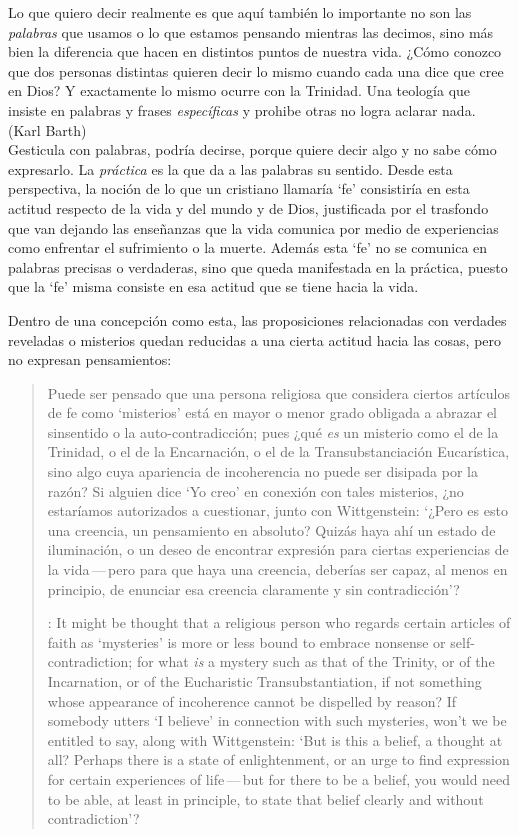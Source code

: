 {  Lo que quiero decir realmente es que aquí también lo importante no son las \emph{palabras} que usamos o lo que estamos pensando mientras las decimos, sino más bien la diferencia que hacen en distintos puntos de nuestra vida. ¿Cómo conozco que dos personas distintas quieren decir lo mismo cuando cada una dice que cree en Dios? Y exactamente lo mismo ocurre con la Trinidad. Una teología que insiste en palabras y frases \emph{específicas} y prohibe otras no logra aclarar nada. (Karl Barth)\\

  Gesticula con palabras, podría decirse, porque quiere decir algo y no sabe cómo expresarlo. La \emph{práctica} es la que da a las palabras su sentido.} Desde esta perspectiva, la noción de lo que un cristiano llamaría `fe' consistiría en esta actitud respecto de la vida y del mundo y de Dios, justificada por el trasfondo que van dejando las enseñanzas que la vida comunica por medio de experiencias como enfrentar el sufrimiento o la muerte. Además esta `fe' no se comunica en palabras precisas o verdaderas, sino que queda manifestada en la práctica, puesto que la `fe' misma consiste en esa actitud que se tiene hacia la vida.

  Dentro de una concepción como esta, las proposiciones relacionadas con verdades reveladas o misterios quedan reducidas a una cierta actitud hacia las cosas, pero no expresan pensamientos: \blockquote[{\cite[211]{teichmann2008ans}}: It might be thought that a religious person who regards certain articles of faith as `mysteries' is more or less bound to embrace nonsense or self-contradiction; for what \emph{is} a mystery such as that of the Trinity, or of the Incarnation, or of the Eucharistic Transubstantiation, if not something whose appearance of incoherence cannot be dispelled by reason? If somebody utters `I believe' in connection with such mysteries, won't we be entitled to say, along with Wittgenstein: `But is this a belief, a thought at all? Perhaps there is a state of enlightenment, or an urge to find expression for certain experiences of life\,---\,but for there to be a belief, you would need to be able, at least in principle, to state that belief clearly and without contradiction'?]{Puede ser pensado que una persona religiosa que considera ciertos artículos de fe como `misterios' está en mayor o menor grado obligada a abrazar el sinsentido o la auto-contradicción; pues ¿qué \emph{es} un misterio como el de la Trinidad, o el de la Encarnación, o el de la Transubstanciación Eucarística, sino algo cuya apariencia de incoherencia no puede ser disipada por la razón? Si alguien dice `Yo creo' en conexión con tales misterios, ¿no estaríamos autorizados a cuestionar, junto con Wittgenstein: `¿Pero es esto una creencia, un pensamiento en absoluto? Quizás haya ahí un estado de iluminación, o un deseo de encontrar expresión para ciertas experiencias de la vida\,---\,pero para que haya una creencia, deberías ser capaz, al menos en principio, de enunciar esa creencia claramente y sin contradicción'?}

